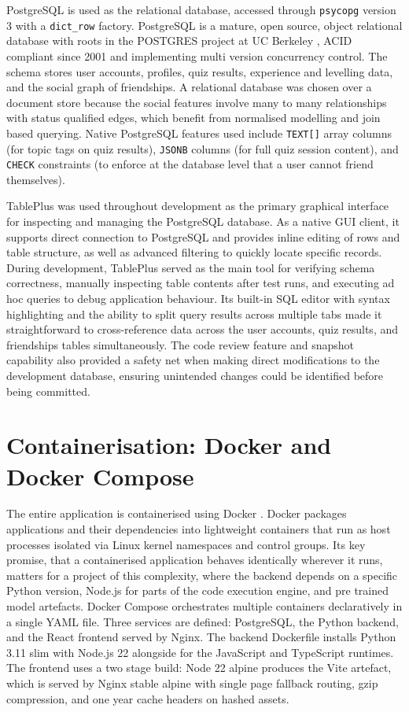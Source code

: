 PostgreSQL \cite{postgres2025} is used as the relational database,
accessed through \texttt{psycopg} version 3 with a \texttt{dict\_row}
factory. PostgreSQL is a mature, open source, object relational
database with roots in the POSTGRES project at UC Berkeley
\cite{stonebraker1986postgres}, ACID compliant since 2001 and
implementing multi version concurrency control. The schema stores
user accounts, profiles, quiz results, experience and levelling data,
and the social graph of friendships. A relational database was chosen
over a document store because the social features involve many to many
relationships with status qualified edges, which benefit from
normalised modelling and join based querying. Native PostgreSQL
features used include \texttt{TEXT[]} array columns (for topic tags on
quiz results), \texttt{JSONB} columns (for full quiz session content),
and \texttt{CHECK} constraints (to enforce at the database level that
a user cannot friend themselves).

TablePlus \cite{tableplus2025} was used throughout development as the primary
graphical interface for inspecting and managing the PostgreSQL database. As a
native GUI client, it supports direct connection to PostgreSQL and provides
inline editing of rows and table structure, as well as advanced filtering to
quickly locate specific records. During development, TablePlus served as the
main tool for verifying schema correctness, manually inspecting table contents after test runs, and executing ad hoc queries to debug application behaviour. Its built-in SQL editor with syntax highlighting and the ability to split query results across multiple tabs made it straightforward to cross-reference data across the user accounts, quiz results, and friendships tables simultaneously. The code review feature and snapshot capability also provided a safety net when making direct modifications to the development database, ensuring unintended changes could be identified before being committed.

\section{Containerisation: Docker and Docker Compose}

The entire application is containerised using Docker
\cite{merkel2014docker}. Docker packages applications and their
dependencies into lightweight containers that run as host processes
isolated via Linux kernel namespaces and control groups. Its key
promise, that a containerised application behaves identically wherever
it runs, matters for a project of this complexity, where the backend
depends on a specific Python version, Node.js for parts of the code
execution engine, and pre trained model artefacts. Docker Compose
\cite{dockercompose2025} orchestrates multiple containers
declaratively in a single YAML file. Three services are defined:
PostgreSQL, the Python backend, and the React frontend served by
Nginx. The backend Dockerfile installs Python 3.11 slim with Node.js
22 alongside for the JavaScript and TypeScript runtimes. The frontend
uses a two stage build: Node 22 alpine produces the Vite artefact,
which is served by Nginx stable alpine with single page fallback
routing, gzip compression, and one year cache headers on hashed
assets.

